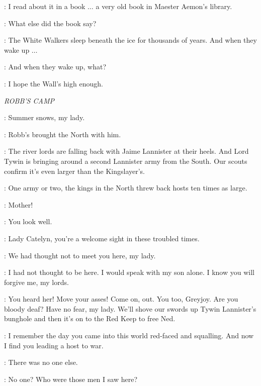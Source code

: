 \SAM: I read about it in a book $\ldots$ a very old book in Maester Aemon's library. 

\JON: What else did the book say? 

\SAM: The White Walkers sleep beneath the ice for thousands of years. And when they wake up $\ldots$  

\PYP: And when they wake up, what? 

\SAM: I hope the Wall's high enough. 


\scene

\textit{ROBB'S CAMP} 


\RODRIK: Summer snows, my lady. 

\CATELYN: Robb's brought the North with him. 

\ROBB: The river lords are falling back with Jaime Lannister at their heels. And Lord Tywin is bringing around a second Lannister army from the South. Our scouts confirm it's even larger than the Kingslayer's. 

\UMBER: One army or two, the kings in the North threw back hosts ten times as large. 


\ROBB: Mother!

\CATELYN: You look well. 

\UMBER: Lady Catelyn, you're a welcome sight in these troubled times. 

\GLOVER: We had thought not to meet you here, my lady. 

\CATELYN: I had not thought to be here. I would speak with my son alone. I know you will forgive me, my lords. 

\UMBER: You heard her! Move your asses! Come on, out.  You too, Greyjoy. Are you bloody deaf? Have no fear, my lady. We'll shove our swords up Tywin Lannister's bunghole and then it's on to the Red Keep to free Ned. 


\CATELYN: I remember the day you came into this world red-faced and squalling. And now I find you leading a host to war. 

\ROBB: There was no one else. 

\CATELYN: No one? Who were those men I saw here? 

